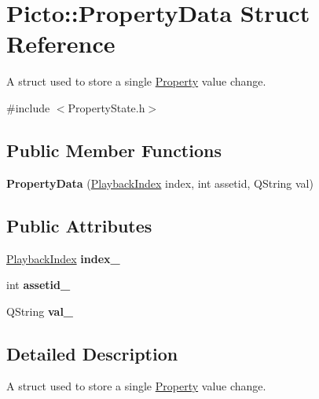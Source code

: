 \hypertarget{struct_picto_1_1_property_data}{\section{Picto\-:\-:Property\-Data Struct Reference}
\label{struct_picto_1_1_property_data}
}


A struct used to store a single \hyperlink{class_picto_1_1_property}{Property} value change.  




{\ttfamily \#include $<$Property\-State.\-h$>$}

\subsection*{Public Member Functions}
\begin{DoxyCompactItemize}
\item 
\hypertarget{struct_picto_1_1_property_data_a5285d7ab4b87ac84cf8ad83791af5af1}{{\bfseries Property\-Data} (\hyperlink{struct_picto_1_1_playback_index}{Playback\-Index} index, int assetid, Q\-String val)}\label{struct_picto_1_1_property_data_a5285d7ab4b87ac84cf8ad83791af5af1}

\end{DoxyCompactItemize}
\subsection*{Public Attributes}
\begin{DoxyCompactItemize}
\item 
\hypertarget{struct_picto_1_1_property_data_abc45b7405faac2074df396c15fb8aefa}{\hyperlink{struct_picto_1_1_playback_index}{Playback\-Index} {\bfseries index\-\_\-}}\label{struct_picto_1_1_property_data_abc45b7405faac2074df396c15fb8aefa}

\item 
\hypertarget{struct_picto_1_1_property_data_a6bb8367e40e1f063858756c006795ba4}{int {\bfseries assetid\-\_\-}}\label{struct_picto_1_1_property_data_a6bb8367e40e1f063858756c006795ba4}

\item 
\hypertarget{struct_picto_1_1_property_data_addcaca6d920482eb3b7af0178f1be7a1}{Q\-String {\bfseries val\-\_\-}}\label{struct_picto_1_1_property_data_addcaca6d920482eb3b7af0178f1be7a1}

\end{DoxyCompactItemize}


\subsection{Detailed Description}
A struct used to store a single \hyperlink{class_picto_1_1_property}{Property} value change. 

